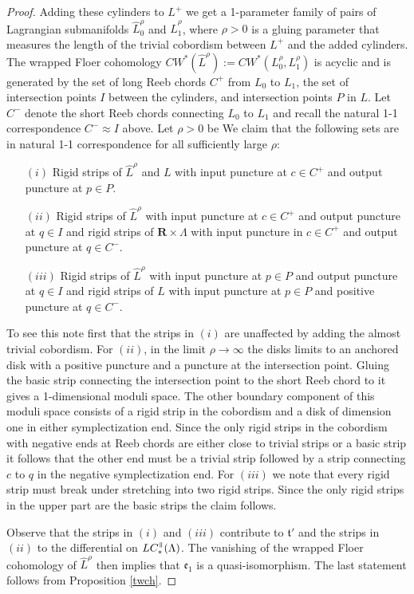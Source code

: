 \documentclass{gtpart}
\newcommand{\e}{\mathfrak{e}}
\renewcommand{\t}{\mathfrak{t}}
\renewcommand{\R}{\mathbf{R}}
\renewcommand{\parallel}{{\mkern3mu\vphantom{\perp}\vrule depth 0pt\mkern2mu\vrule depth
0pt\mkern3mu}}
\begin{document}
\begin{proof}
Adding these cylinders to $L^{+}$ we get a 1-parameter family of pairs of Lagrangian submanifolds $\hat L^{\rho}_{0}$ and $\hat L_{1}^{\rho}$, where $\rho>0$ is a gluing parameter that measures the length of the trivial cobordism between $L^{+}$ and the added cylinders. The wrapped Floer cohomology $CW^{\ast}(\hat L^{\rho}):=CW^{\ast}(L_{0}^{\rho},L^{\rho}_{1})$ is acyclic and is generated by the set of long Reeb chords $C^{+}$ from $L_{0}$ to $L_{1}$, the set of intersection points $I$ between the cylinders, and intersection points $P$ in $L$. Let $C^{-}$ denote the short Reeb chords connecting $L_{0}$ to $L_{1}$ and recall the natural 1-1 correspondence $C^{-}\approx I$ above. Let $\rho>0$ be  We claim that the following sets are in natural 1-1 correspondence  for all sufficiently large $\rho$: 
\begin{itemize}
\item[$(i)$] Rigid strips of $\hat L^{\rho}$ and $L$ with input puncture at  $c\in C^{+}$ and output puncture at $p\in P$.
\item[$(ii)$] Rigid strips of $\hat L^{\rho}$ with input puncture at  $c\in C^{+}$ and output puncture at $q\in I$ and rigid strips of $\R\times\Lambda$ with input puncture in $c\in C^{+}$ and output puncture at $q\in C^{-}$.
\item[$(iii)$] Rigid strips of $\hat L^{\rho}$ with input puncture at  $p\in P$ and output puncture at $q\in I$ and rigid strips of $L$ with input puncture at $p\in P$ and positive puncture at $q\in C^{-}$.
\end{itemize}   
To see this note first that the strips in $(i)$ are unaffected by adding the almost trivial cobordism. For $(ii)$, in the limit $\rho\to\infty$ the disks limits to an anchored disk with a positive puncture and a puncture at the intersection point. Gluing the basic strip connecting the intersection point to the short Reeb chord to it gives a 1-dimensional moduli space. The other boundary component of this moduli space consists of a rigid strip in the cobordism and a disk of dimension one in either symplectization end. Since the only rigid strips in the cobordism with negative ends at Reeb chords are either close to trivial strips or a basic strip it follows that the other end must be a trivial strip followed by a strip connecting $c$ to $q$ in the negative symplectization end. For $(iii)$ we note that every rigid strip must break under stretching into two rigid strips. Since the only rigid strips in the upper part are the basic strips the claim follows.  

Observe that the strips in $(i)$ and $(iii)$ contribute to $\t'$ and the strips in $(ii)$ to the differential on $LC_{\ast}^{\parallel}(\Lambda)$. The vanishing of the wrapped Floer cohomology of $\hat L^{\rho}$ then implies that $\e_{1}$ is a quasi-isomorphism. The last statement follows from Proposition \ref{twch}. 
\end{proof}
\end{document}
